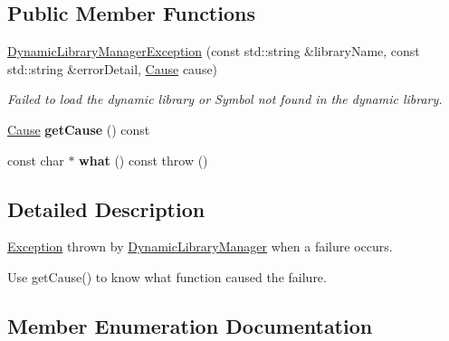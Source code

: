 \subsection*{Public Member Functions}
\begin{DoxyCompactItemize}
\item 
\hyperlink{class_dynamic_library_manager_exception_a15629092a054849f1cb73f8f468f8125}{Dynamic\+Library\+Manager\+Exception} (const std\+::string \&library\+Name, const std\+::string \&error\+Detail, \hyperlink{class_dynamic_library_manager_exception_a73b4694c152e0693fbc19fb04987a0b9}{Cause} cause)\hypertarget{class_dynamic_library_manager_exception_a15629092a054849f1cb73f8f468f8125}{}\label{class_dynamic_library_manager_exception_a15629092a054849f1cb73f8f468f8125}

\begin{DoxyCompactList}\small\item\em Failed to load the dynamic library or Symbol not found in the dynamic library. \end{DoxyCompactList}\item 
\hyperlink{class_dynamic_library_manager_exception_a73b4694c152e0693fbc19fb04987a0b9}{Cause} {\bfseries get\+Cause} () const \hypertarget{class_dynamic_library_manager_exception_ab389b721f9a45814b8269ba865a1f25f}{}\label{class_dynamic_library_manager_exception_ab389b721f9a45814b8269ba865a1f25f}

\item 
const char $\ast$ {\bfseries what} () const   throw ()\hypertarget{class_dynamic_library_manager_exception_a3e6ed8a5e743a8ac80e4cb73a5d87360}{}\label{class_dynamic_library_manager_exception_a3e6ed8a5e743a8ac80e4cb73a5d87360}

\end{DoxyCompactItemize}


\subsection{Detailed Description}
\hyperlink{class_exception}{Exception} thrown by \hyperlink{class_dynamic_library_manager}{Dynamic\+Library\+Manager} when a failure occurs. 

Use get\+Cause() to know what function caused the failure. 

\subsection{Member Enumeration Documentation}
